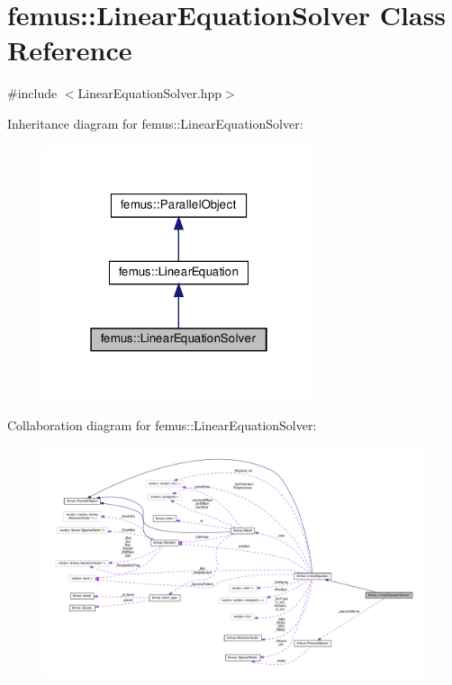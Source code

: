 \hypertarget{classfemus_1_1_linear_equation_solver}{}\section{femus\+:\+:Linear\+Equation\+Solver Class Reference}
\label{classfemus_1_1_linear_equation_solver}


{\ttfamily \#include $<$Linear\+Equation\+Solver.\+hpp$>$}



Inheritance diagram for femus\+:\+:Linear\+Equation\+Solver\+:
\nopagebreak
\begin{figure}[H]
\begin{center}
\leavevmode
\includegraphics[width=226pt]{classfemus_1_1_linear_equation_solver__inherit__graph}
\end{center}
\end{figure}


Collaboration diagram for femus\+:\+:Linear\+Equation\+Solver\+:
\nopagebreak
\begin{figure}[H]
\begin{center}
\leavevmode
\includegraphics[width=350pt]{classfemus_1_1_linear_equation_solver__coll__graph}
\end{center}
\end{figure}
